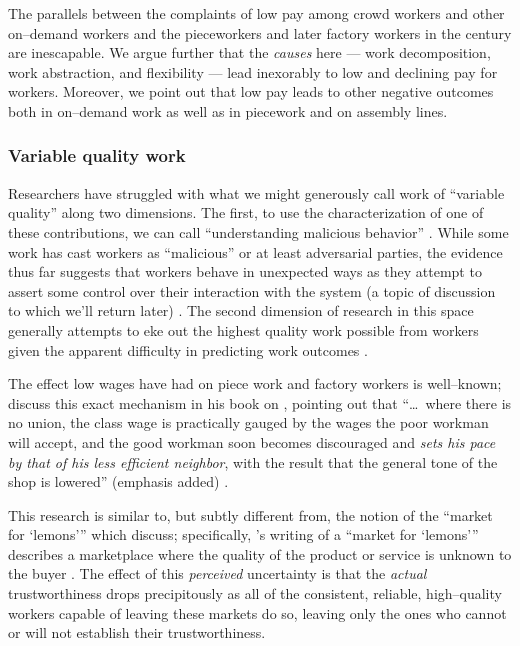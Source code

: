 \documentclass[trackingWork]{subfiles}
\begin{document}
{The parallels between the complaints of low pay among crowd workers and other on--demand workers
and the pieceworkers and later factory workers in the  century
are inescapable.
We argue further that the \textit{causes} here
--- work decomposition,
work abstraction, and
flexibility ---
lead inexorably to low and declining pay for workers.
Moreover, we point out that low pay leads to other negative outcomes both
in on--demand work
as well as
in piecework and on assembly lines.

\subsubsection{Variable quality work}\label{sec:varQualWork}
Researchers have struggled with what we might generously call work of ``variable quality''
along two dimensions.
The first, to use the characterization of one of these contributions, we can call
``understanding malicious behavior''
\cite{MaliciousCrowdworkersGadiraju}.
While some work has cast workers as ``malicious'' or at least adversarial parties,
the evidence thus far suggests that
workers behave in unexpected ways as they attempt to assert some control over their interaction with the system
(a topic of discussion to which we'll return later)
\cite{uberAlgorithm}.
The second dimension of research in this space generally attempts
to eke out the highest quality work possible from workers
given the apparent difficulty in predicting work outcomes
\cite{embracingErrorKrishna}.






The effect low wages have had on piece work and factory workers is well--known;
\citeauthor{gantt1913work} discuss this exact mechanism in his book on
, pointing out that
``\dots~where there is no union,
the class wage is practically gauged by the wages the poor workman will accept,
and the good workman soon becomes discouraged and \textit{sets his pace by that of his less efficient neighbor},
with the result that the general tone of the shop is lowered'' (emphasis added)
\cite{gantt1913work}.

This research is similar to, but subtly different from, the notion of the ``market for `lemons'''
which \citeauthor{fort2011amazon} discuss;
specifically, \citeauthor{akerlof1970market}'s writing of a ``market for `lemons'''
describes a marketplace where the quality of the product or service is unknown to the buyer
\cite{fort2011amazon,akerlof1970market}.
The effect of this \textit{perceived} uncertainty is that
the \textit{actual} trustworthiness drops precipitously
as all of the consistent, reliable, high--quality workers capable of leaving these markets do so,
leaving only the ones who cannot or will not establish their trustworthiness.

}
\end{document}
